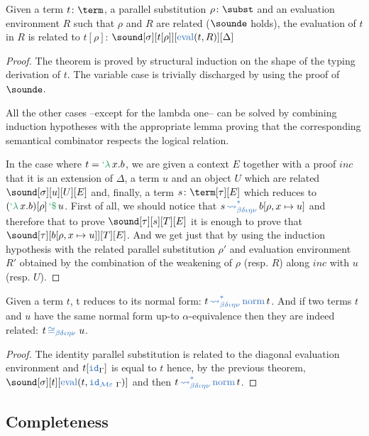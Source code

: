 \begin{theorem}Given a term $t \colon \term$, a parallel substitution $\rho \colon \subst$
and an evaluation environment $R$ such that $\rho$ and $R$ are related ($\sounde$
holds), the evaluation of $t$ in $R$ is related to $t [\rho]$:
$\sound[\sigma][\protect{t[\rho]}][\termeval (t , R)][\Delta]$
\end{theorem}
\begin{proof}The theorem is proved by structural induction on the shape of the
typing derivation of $t$. The variable case is trivially discharged by using the
proof of $\sounde$.

All the other cases --except for the lambda one-- can be solved by combining
induction hypotheses with the appropriate lemma proving that the corresponding
semantical combinator respects the logical relation.

In the case where $t = \telam x. b$, we are given a context $E$ together with a
proof $inc$ that it is an extension of $\Delta$, a term $u$ and an object $U$
which are related $\sound[\sigma][u][U][E]$ and, finally, a term $s \colon \term[\tau][E]$
which reduces to $(\telam x. b) [\rho] \teapp u$.
First of all, we should notice that $s \reduces b [\rho , x \mapsto u]$
and therefore that to prove $\sound[\tau][s][T][E]$ it is enough to prove that
$\sound[\tau][\protect{b [\rho , x \mapsto u]}][T][E]$. And we get just that by
using the induction hypothesis with the related parallel substitution $\rho'$ and
evaluation environment $R'$ obtained by the combination of the weakening of $\rho$
(resp. $R$) along $inc$ with $u$ (resp. $U$).
\end{proof}

\begin{corollary}Given a term $t$, t reduces to its normal form: $t \reduces \norm t$.
And if two terms $t$ and $u$ have the same normal form up-to $\alpha$-equivalence
then they are indeed related: $t \conv u$.
\end{corollary}
\begin{proof}The identity parallel substitution is related to the diagonal evaluation
environment and $t [\idsubst]$ is equal to $t$ hence, by the previous theorem,
$\sound[\sigma][t][\termeval(t , \idmodele)]$ and then $t \reduces \norm t$.
\end{proof}



\subsection{Completeness}

